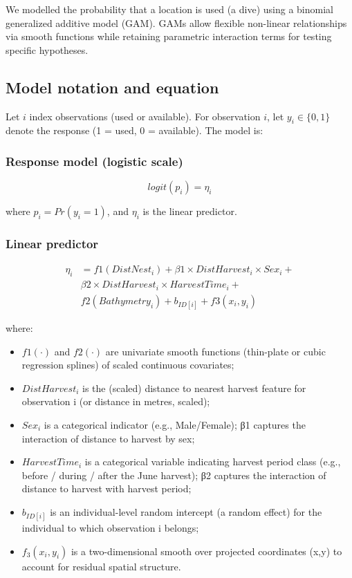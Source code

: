 \documentclass[
  letterpaper,
  DIV=11,
  numbers=noendperiod]{scrartcl}
\providecommand{\tightlist}{%
  \setlength{\itemsep}{0pt}\setlength{\parskip}{0pt}}
\begin{document}
We modelled the probability that a location is used (a dive) using a
binomial generalized additive model (GAM). GAMs allow flexible
non-linear relationships via smooth functions while retaining parametric
interaction terms for testing specific hypotheses.

\subsection{Model notation and
equation}\label{model-notation-and-equation}

Let \(i\) index observations (used or available). For observation \(i\),
let \(y_i ∈ \{0, 1\}\) denote the response (1 = used, 0 = available).
The model is:

\subsubsection{Response model (logistic
scale)}\label{response-model-logistic-scale}

\[logit(p_i) = η_i\]

where \(p_i = Pr(y_i = 1)\), and \(η_i\) is the linear predictor.

\subsubsection{Linear predictor}\label{linear-predictor}

\[
\begin{split}
η_i &= f1(DistNest_i) + β1 × DistHarvest_i × Sex_i +  \\
& β2 × DistHarvest_i × HarvestTime_i + \\
& f2(Bathymetry_i) + b_{ID[i]} + f3(x_i, y_i)
\end{split}
\]

where:

\begin{itemize}
\tightlist
\item
  \(f1(·)\) and \(f2(·)\) are univariate smooth functions (thin-plate or
  cubic regression splines) of scaled continuous covariates;
\item
  \(DistHarvest_i\) is the (scaled) distance to nearest harvest feature
  for observation i (or distance in metres, scaled);
\item
  \(Sex_i\) is a categorical indicator (e.g., Male/Female); β1 captures
  the interaction of distance to harvest by sex;
\item
  \(HarvestTime_i\) is a categorical variable indicating harvest period
  class (e.g., before / during / after the June harvest); β2 captures
  the interaction of distance to harvest with harvest period;
\item
  \(b_{ID[i]}\) is an individual-level random intercept (a random
  effect) for the individual to which observation i belongs;
\item
  \(f_3(x_i, y_i)\) is a two-dimensional smooth over projected
  coordinates (x,y) to account for residual spatial structure.
\end{itemize}
\end{document}

